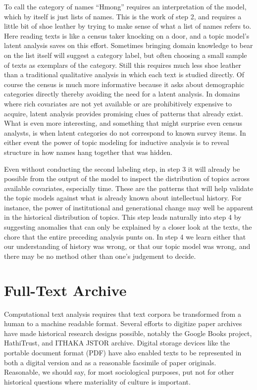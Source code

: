 \documentclass[]{book}
\theoremstyle{definition}
\theoremstyle{definition}
\theoremstyle{definition}
\theoremstyle{remark}
\begin{document}
To call the category of names ``Hmong'' requires an interpretation of
the model, which by itself is just lists of names. This is the work of
step 2, and requires a little bit of shoe leather by trying to make
sense of what a list of names refers to. Here reading texts is like a
census taker knocking on a door, and a topic model's latent analysis
saves on this effort. Sometimes bringing domain knowledge to bear on the
list itself will suggest a category label, but often choosing a small
sample of texts as exemplars of the category. Still this requires much
less shoe leather than a traditional qualitative analysis in which each
text is studied directly. Of course the census is much more informative
because it asks about demographic categories directly thereby avoiding
the need for a latent analysis. In domains where rich covariates are not
yet available or are prohibitively expensive to acquire, latent analysis
provides promising clues of patterns that already exist. What is even
more interesting, and something that might surprise even census
analysts, is when latent categories do not correspond to known survey
items. In either event the power of topic modeling for inductive
analysis is to reveal structure in how names hang together that was
hidden.

Even without conducting the second labeling step, in step 3 it will
already be possible from the output of the model to inspect the
distribution of topics across available covariates, especially time.
These are the patterns that will help validate the topic models against
what is already known about intellectual history. For instance, the
power of institutional and generational change may well be apparent in
the historical distribution of topics. This step leads naturally into
step 4 by suggesting anomalies that can only be explained by a closer
look at the texts, the chore that the entire preceding analysis punts
on. In step 4 we learn either that our understanding of history was
wrong, or that our topic model was wrong, and there may be no method
other than one's judgement to decide.

\hypertarget{full-text-archive}{%
\section{Full-Text Archive}\label{full-text-archive}}

Computational text analysis requires that text corpora be transformed
from a human to a machine readable format. Several efforts to digitize
paper archives have made historical research designs possible, notably
the Google Books project, HathiTrust, and ITHAKA JSTOR archive. Digital
storage devices like the portable document format (PDF) have also
enabled texts to be represented in both a digital version and as a
reasonable facsimile of paper originals. Reasonable, we should say, for
most sociological purposes, put not for other historical questions where
materiality of culture is important.
\citep[149]{Schreibman2014NonConsumptive}
\end{document}
